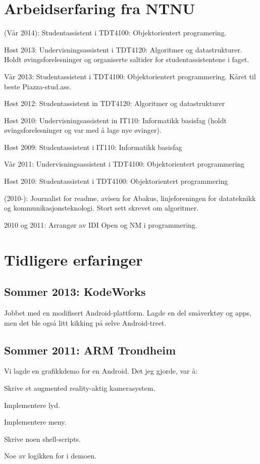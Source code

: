 \documentclass[letterpaper]{article}
\renewenvironment{itemize}{
  \begin{list}{}{
    \setlength{\leftmargin}{1.5em}
  }
}{
  \end{list}
}
\begin{document}
\section*{Arbeidserfaring fra NTNU}
\begin{itemize}
\item (Vår 2014): Studentassistent i TDT4100: Objektorientert programering.
\item Høst 2013: Undervisningsassistent i TDT4120: Algoritmer og
  datastrukturer. Holdt øvingsforelesninger og organiserte saltider for
  studentassistentene i faget.
\item Vår 2013: Studentassistent i TDT4100: Objektorientert
  programmering. Kåret til beste Piazza-stud.ass.
\item Høst 2012: Studentassistent in TDT4120: Algoritmer og datastrukturer

\item Høst 2010: Undervisningsassistent in IT110: Informatikk basisfag
  (holdt øvingsforelesninger og var med å lage nye øvinger).
\item Høst 2009: Studentassistent i  IT110: Informatikk basisfag

\item Vår 2011: Undervisningsassistent i TDT4100: Objektorientert programmering
\item Høst 2010: Studentassistent i TDT4100: Objektorientert programmering

\item (2010-): Journalist for readme, avisen for Abakus,
  linjeforeningen for datateknikk og kommunikasjonsteknologi. Stort
  sett skrevet om algoritmer.
\item 2010 og 2011: Arrangør av IDI Open og NM i programmering.
\end{itemize}

\section*{Tidligere erfaringer}
\subsection*{Sommer 2013: KodeWorks}
Jobbet med en modifisert Android-plattform. Lagde en del småverktøy og
apps, men det ble også litt kikking på selve Android-treet.
\subsection*{Sommer 2011: ARM Trondheim}
Vi lagde en grafikkdemo for en Android. Det jeg gjorde, var å:
\begin{itemize}
\item Skrive et augmented reality-aktig kamerasystem.
\item Implementere lyd.
\item Implementere meny.
\item Skrive noen shell-scripts.
\item Noe av logikken for i demoen.
\end{itemize}
\end{document}
